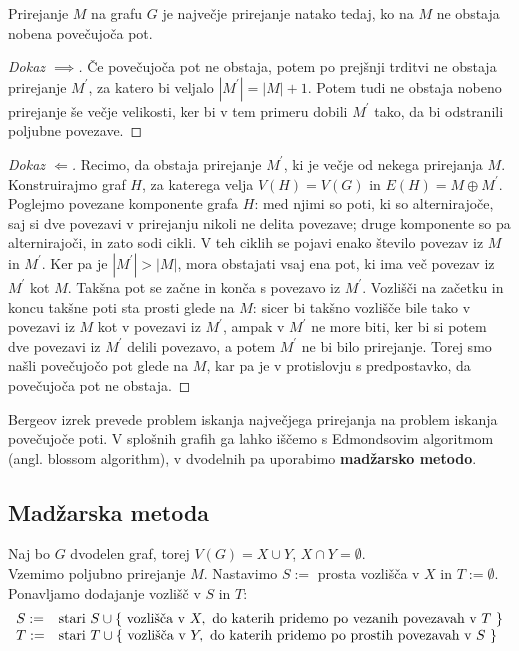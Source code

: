 \documentclass[11pt, a4paper]{article}
\begin{document}
    \begin{theorem}
        Prirejanje \(M\) na grafu \(G\) je največje prirejanje natako tedaj, ko na \(M\) ne obstaja nobena povečujoča pot.
    \end{theorem}

    \begin{proof}[Dokaz \(\implies\)]
        Če povečujoča pot ne obstaja, potem po prejšnji trditvi ne obstaja prirejanje \(M^\prime\), za katero bi veljalo \(|M^\prime| = |M|+1\). Potem tudi ne obstaja nobeno prirejanje še večje velikosti, ker bi v tem primeru dobili \(M^\prime\) tako, da bi  odstranili poljubne povezave.
    \end{proof}

    \begin{proof}[Dokaz \(\Longleftarrow\)]
        Recimo, da obstaja prirejanje \(M^\prime\), ki je večje od nekega prirejanja \(M\). Konstruirajmo graf \(H\), za katerega velja \(V(H)=V(G)\) in \(E(H)=M \oplus M^\prime\). Poglejmo povezane komponente grafa \(H\): med njimi so poti, ki so alternirajoče, saj si dve povezavi v prirejanju nikoli ne delita povezave; druge komponente so pa alternirajoči, in zato sodi cikli. V teh ciklih se pojavi enako število povezav iz \(M\) in \(M^\prime\). Ker pa je \(|M^\prime| > |M|\), mora obstajati vsaj ena pot, ki ima več povezav iz \(M^\prime\) kot \(M\). Takšna pot se začne in konča s povezavo iz \(M^\prime\). Vozlišči na začetku in koncu takšne poti sta prosti glede na \(M\): sicer bi takšno vozlišče bile tako v povezavi iz \(M\) kot v povezavi iz \(M^\prime\), ampak v \(M^\prime\) ne more biti, ker bi si potem dve povezavi iz \(M^\prime\) delili povezavo, a potem \(M^\prime\) ne bi bilo prirejanje. Torej smo našli povečujočo pot glede na \(M\), kar pa je v protislovju s predpostavko, da povečujoča pot ne obstaja.
    \end{proof}

    Bergeov izrek prevede problem iskanja največjega prirejanja na problem iskanja povečujoče poti. V splošnih grafih ga lahko iščemo s Edmondsovim algoritmom (angl. blossom algorithm), v dvodelnih pa uporabimo \textbf{madžarsko metodo}.



    \subsection{Madžarska metoda}
    Naj bo \(G\) dvodelen graf, torej \(V(G)=X \cup Y\), \(X \cap Y = \emptyset\). \\
    Vzemimo poljubno prirejanje \(M\). Nastavimo \(S:=\) prosta vozlišča v \(X\) in \(T:= \emptyset\). Ponavljamo dodajanje vozlišč v \(S\) in \(T\):
    \[
        \begin{array}{ l l }
            S:= & \text{stari } S \cup \{\ \text{vozlišča v}\ X,\ \text{do katerih pridemo po vezanih povezavah v}\ T\ \} \\

            T:= & \text{stari } T \cup \{\ \text{vozlišča v}\ Y,\ \text{do katerih pridemo po prostih povezavah v}\ S\ \}
        \end{array}
    \]
\end{document}
